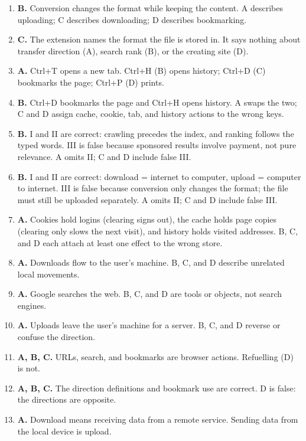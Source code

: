 \begin{enumerate}[label=\textbf{Q\arabic*.}, leftmargin=*]
  submitting the filled form back is an upload. A reverses the order; C and
  D name unrelated steps.
\item \textbf{B.} Conversion changes the format while keeping the content.
  A describes uploading; C describes downloading; D describes bookmarking.
\item \textbf{C.} The extension names the format the file is stored in.
  It says nothing about transfer direction (A), search rank (B), or the
  creating site (D).
\item \textbf{A.} Ctrl+T opens a new tab. Ctrl+H (B) opens history; Ctrl+D
  (C) bookmarks the page; Ctrl+P (D) prints.
\item \textbf{B.} Ctrl+D bookmarks the page and Ctrl+H opens history. A
  swaps the two; C and D assign cache, cookie, tab, and history actions to
  the wrong keys.
\item \textbf{B.} I and II are correct: crawling precedes the index, and
  ranking follows the typed words. III is false because sponsored results
  involve payment, not pure relevance. A omits II; C and D include false III.
\item \textbf{B.} I and II are correct: download = internet to computer,
  upload = computer to internet. III is false because conversion only
  changes the format; the file must still be uploaded separately. A omits
  II; C and D include false III.
\item \textbf{A.} Cookies hold logins (clearing signs out), the cache holds
  page copies (clearing only slows the next visit), and history holds visited
  addresses. B, C, and D each attach at least one effect to the wrong store.

\item \textbf{A.} Downloads flow to the user's machine. B, C, and D describe unrelated local movements.
\item \textbf{A.} Google searches the web. B, C, and D are tools or objects, not search engines.
\item \textbf{A.} Uploads leave the user's machine for a server. B, C, and D reverse or confuse the direction.
\item \textbf{A, B, C.} URLs, search, and bookmarks are browser actions. Refuelling (D) is not.
\item \textbf{A, B, C.} The direction definitions and bookmark use are correct. D is false: the directions are opposite.
\item \textbf{A.} Download means receiving data from a remote service. Sending data from the local device is upload.


\end{enumerate}
